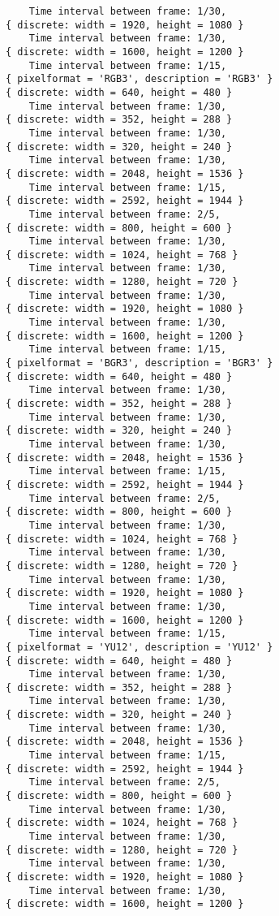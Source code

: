 \documentclass{article}
\begin{document}
\begin{lstlisting}
	Time interval between frame: 1/30, 
{ discrete: width = 1920, height = 1080 }
	Time interval between frame: 1/30, 
{ discrete: width = 1600, height = 1200 }
	Time interval between frame: 1/15, 
{ pixelformat = 'RGB3', description = 'RGB3' }
{ discrete: width = 640, height = 480 }
	Time interval between frame: 1/30, 
{ discrete: width = 352, height = 288 }
	Time interval between frame: 1/30, 
{ discrete: width = 320, height = 240 }
	Time interval between frame: 1/30, 
{ discrete: width = 2048, height = 1536 }
	Time interval between frame: 1/15, 
{ discrete: width = 2592, height = 1944 }
	Time interval between frame: 2/5, 
{ discrete: width = 800, height = 600 }
	Time interval between frame: 1/30, 
{ discrete: width = 1024, height = 768 }
	Time interval between frame: 1/30, 
{ discrete: width = 1280, height = 720 }
	Time interval between frame: 1/30, 
{ discrete: width = 1920, height = 1080 }
	Time interval between frame: 1/30, 
{ discrete: width = 1600, height = 1200 }
	Time interval between frame: 1/15, 
{ pixelformat = 'BGR3', description = 'BGR3' }
{ discrete: width = 640, height = 480 }
	Time interval between frame: 1/30, 
{ discrete: width = 352, height = 288 }
	Time interval between frame: 1/30, 
{ discrete: width = 320, height = 240 }
	Time interval between frame: 1/30, 
{ discrete: width = 2048, height = 1536 }
	Time interval between frame: 1/15, 
{ discrete: width = 2592, height = 1944 }
	Time interval between frame: 2/5, 
{ discrete: width = 800, height = 600 }
	Time interval between frame: 1/30, 
{ discrete: width = 1024, height = 768 }
	Time interval between frame: 1/30, 
{ discrete: width = 1280, height = 720 }
	Time interval between frame: 1/30, 
{ discrete: width = 1920, height = 1080 }
	Time interval between frame: 1/30, 
{ discrete: width = 1600, height = 1200 }
	Time interval between frame: 1/15, 
{ pixelformat = 'YU12', description = 'YU12' }
{ discrete: width = 640, height = 480 }
	Time interval between frame: 1/30, 
{ discrete: width = 352, height = 288 }
	Time interval between frame: 1/30, 
{ discrete: width = 320, height = 240 }
	Time interval between frame: 1/30, 
{ discrete: width = 2048, height = 1536 }
	Time interval between frame: 1/15, 
{ discrete: width = 2592, height = 1944 }
	Time interval between frame: 2/5, 
{ discrete: width = 800, height = 600 }
	Time interval between frame: 1/30, 
{ discrete: width = 1024, height = 768 }
	Time interval between frame: 1/30, 
{ discrete: width = 1280, height = 720 }
	Time interval between frame: 1/30, 
{ discrete: width = 1920, height = 1080 }
	Time interval between frame: 1/30, 
{ discrete: width = 1600, height = 1200 }

\end{lstlisting}
\end{document}
